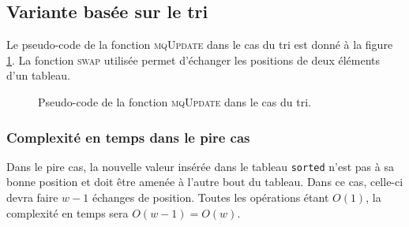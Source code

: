 \documentclass[a4paper, 12pt]{article}
\begin{document}
	\subsection{Variante basée sur le tri}
	\label{subsec:subsec_tri}
	Le pseudo-code de la fonction \textsc{mqUpdate} dans le cas du tri est donné à la figure \ref{fig:pseudo_code_tri}. La fonction \textsc{swap} utilisée permet d'échanger les positions de deux éléments d'un tableau.\par
	\begin{figure}[!ht]
		\centering
		\setlength{\fboxsep}{3mm}
		\setlength{\fboxrule}{1.5pt}
		\caption{Pseudo-code de la fonction \textsc{mqUpdate} dans le cas du tri.}
		\label{fig:pseudo_code_tri}
	\end{figure}
	\subsubsection{Complexité en temps dans le pire cas}
	Dans le pire cas, la nouvelle valeur insérée dans le tableau \texttt{sorted} n'est pas à sa bonne position et doit être amenée à l'autre bout du tableau. Dans ce cas, celle-ci devra faire \(w-1\) échanges de position. Toutes les opérations étant \(O\left(1\right)\), la complexité en temps sera \(O\left(w-1\right) = O\left(w\right)\).\par
\end{document}
